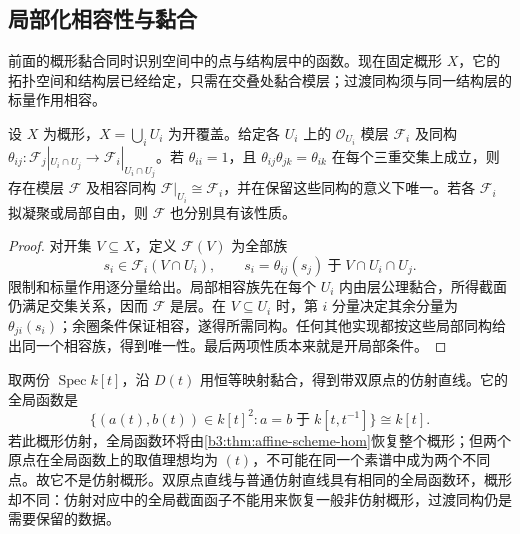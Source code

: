 \subsection{局部化相容性与黏合}
\label{b3:subsec:2402:03}

前面的概形黏合同时识别空间中的点与结构层中的函数。现在固定概形 \(X\)，它的拓扑空间和结构层已经给定，只需在交叠处黏合模层；过渡同构须与同一结构层的标量作用相容。

\begin{proposition}\label{b3:prop:sheaf-gluing}
	设 \(X\) 为概形，\(X=\bigcup_iU_i\) 为开覆盖。给定各 \(U_i\) 上的 \(\mathcal O_{U_i}\) 模层 \(\mathcal F_i\) 及同构 \(\theta_{ij}:\mathcal F_j|_{U_i\cap U_j}\rightarrow\mathcal F_i|_{U_i\cap U_j}\)。若 \(\theta_{ii}=1\)，且 \(\theta_{ij}\theta_{jk}=\theta_{ik}\) 在每个三重交集上成立，则存在模层 \(\mathcal F\) 及相容同构 \(\mathcal F|_{U_i}\cong\mathcal F_i\)，并在保留这些同构的意义下唯一。若各 \(\mathcal F_i\) 拟凝聚或局部自由，则 \(\mathcal F\) 也分别具有该性质。
\end{proposition}
\begin{proof}
	对开集 \(V\subseteq X\)，定义 \(\mathcal F(V)\) 为全部族
	\[
		s_i\in\mathcal F_i(V\cap U_i),\qquad s_i=\theta_{ij}(s_j)\ \text{于}\;V\cap U_i\cap U_j.
	\]
	限制和标量作用逐分量给出。局部相容族先在每个 \(U_i\) 内由层公理黏合，所得截面仍满足交集关系，因而 \(\mathcal F\) 是层。在 \(V\subseteq U_i\) 时，第 \(i\) 分量决定其余分量为 \(\theta_{ji}(s_i)\)；余圈条件保证相容，遂得所需同构。任何其他实现都按这些局部同构给出同一个相容族，得到唯一性。最后两项性质本来就是开局部条件。
\end{proof}

取两份 \(\operatorname{Spec}k[t]\)，沿 \(D(t)\) 用恒等映射黏合，得到带双原点的仿射直线。它的全局函数是
\[
	\{(a(t),b(t))\in k[t]^2:a=b\;\text{于}\;k[t,t^{-1}]\} \cong k[t].
\]
若此概形仿射，全局函数环将由\cref{b3:thm:affine-scheme-hom}恢复整个概形；但两个原点在全局函数上的取值理想均为 \((t)\)，不可能在同一个素谱中成为两个不同点。故它不是仿射概形。双原点直线与普通仿射直线具有相同的全局函数环，概形却不同：仿射对应中的全局截面函子不能用来恢复一般非仿射概形，过渡同构仍是需要保留的数据。
